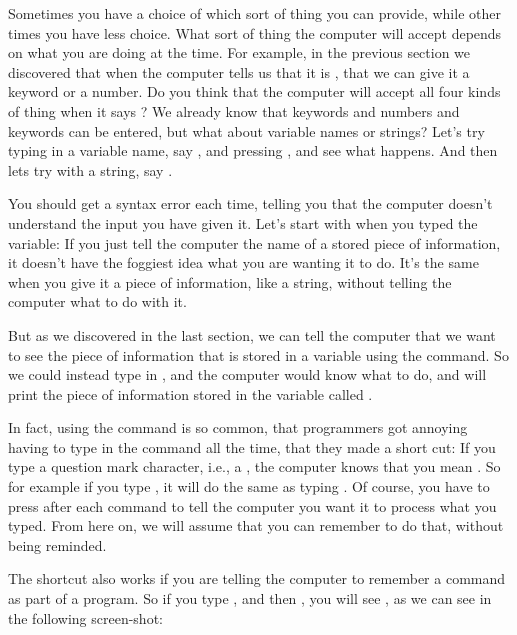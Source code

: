 \needspace{4cm} %
Sometimes you have a choice of which sort of thing you can provide, while other times you have less choice. What
sort of thing the computer will accept depends on what you are doing at the time.  For example, in the previous
section we discovered that when the computer tells us that it is , that we can give it
a keyword or a number.  Do you think that the computer will accept all four kinds of thing when it says
?  We already know that keywords and numbers and keywords can be entered, but what about
variable names or strings?  Let's try typing in a variable name, say , and pressing ,
and see what happens.  And then lets try with a string, say .


You should get a syntax error each time, telling you that the computer doesn't understand the input you have given it.
Let's start with when you typed the variable: If you just tell the computer the name of a stored piece of information,
it doesn't have the foggiest idea what you are wanting it to do.  It's the same when you give it a piece of information,
like a string, without telling the computer what to do with it.

But as we discovered in the last section, we can tell the computer that we want to see the piece of information that is
stored in a variable using the  command.  So we could instead type in , and
the computer would know what to do, and will print the piece of information stored in the variable called .

In fact, using the  command is so common, that programmers got annoying having to type in the 
command all the time, that they made a short cut: If you type a question mark character, i.e., a , the computer
knows that you mean .  So for example if you type , it will do the same as typing
.  Of course, you have to press  after each command to tell the computer
you want it to process what you typed.  From here on, we will assume that you can remember to do that, without being reminded.

\needspace{4cm} %
The  shortcut also works if you are telling the computer to remember a command as part of a program.
So if you type , and then , you will see , as we can see
in the following screen-shot:

